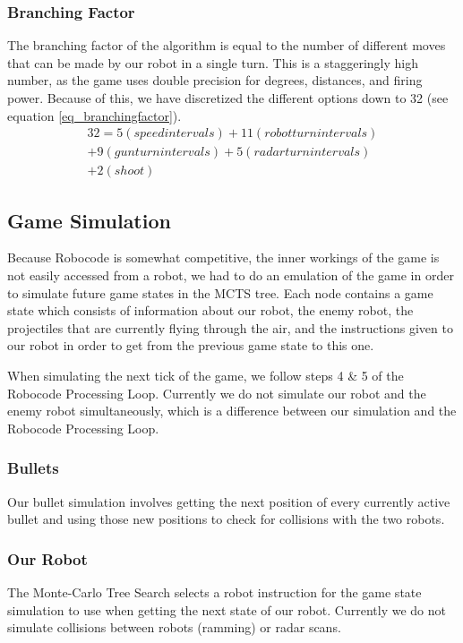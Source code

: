 \subsubsection{Branching Factor}
The branching factor of the algorithm is equal to the number of different moves that can be made by our robot in a single turn. This is a staggeringly high number, as the game uses double precision for degrees, distances, and firing power. Because of this, we have discretized the different options down to 32 (see equation \ref{eq_branchingfactor}).
\begin{equation}
\begin{split}
\label{eq_branchingfactor}
32 = 5 (speed intervals) + 11 (robot turn intervals)\\
+9 (gun turn intervals) + 5 (radar turn intervals) 
\\+ 2 (shoot)
\end{split}
\end{equation}
\subsection{Game Simulation}
Because Robocode is somewhat competitive, the inner workings of the game is not easily accessed from a robot, we had to do an emulation of the game in order to simulate future game states in the MCTS tree. Each node contains a game state which consists of information about our robot, the enemy robot, the projectiles that are currently flying through the air, and the instructions given to our robot in order to get from the previous game state to this one.

When simulating the next tick of the game, we follow steps 4 \& 5 of the Robocode Processing Loop\cite{wiki:robocodeGamePhysics}. Currently we do not simulate our robot and the enemy robot simultaneously, which is a difference between our simulation and the Robocode Processing Loop.
\subsubsection{Bullets} 
Our bullet simulation involves getting the next position of every currently active bullet and using those new positions to check for collisions with the two robots.
\subsubsection{Our Robot}
The Monte-Carlo Tree Search selects a robot instruction for the game state simulation to use when getting the next state of our robot. Currently we do not simulate collisions between robots (ramming) or radar scans.
